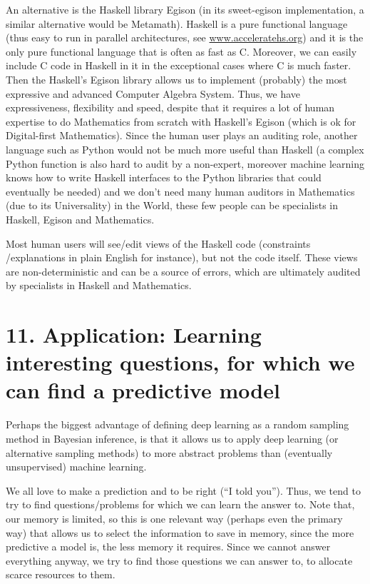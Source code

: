 \documentclass[11pt]{book}
\begin{document}
An alternative is the Haskell library Egison (in its sweet-egison
implementation\cite{egi_functional_2020}, a similar alternative would be
Metamath\cite{polu_generative_2020}). Haskell is a pure functional language (thus easy to run in
parallel architectures, see \url{www.acceleratehs.org}) and it is the
only pure functional language that is often as fast as C. Moreover, we
can easily include C code in Haskell in it in the exceptional cases
where C is much faster. Then the Haskell's Egison library allows us to
implement (probably) the most expressive and advanced Computer Algebra
System. Thus, we have expressiveness, flexibility and speed, despite
that it requires a lot of human expertise to do Mathematics from scratch
with Haskell's Egison (which is ok for Digital-first Mathematics). Since
the human user plays an auditing role, another language such as Python
would not be much more useful than Haskell (a complex Python function is
also hard to audit by a non-expert, moreover machine learning knows how
to write Haskell interfaces to the Python libraries that could
eventually be needed) and we don't need many human auditors in
Mathematics (due to its Universality) in the World, these few people can
be specialists in Haskell, Egison and Mathematics.

Most human users will see/edit views of the Haskell code (constraints
/explanations in plain English for instance), but not the code itself.
These views are non-deterministic and can be a source of errors, which
are ultimately audited by specialists in Haskell and Mathematics.

\hypertarget{application-learning-interesting-questions-for-which-we-can-find-a-predictive-model}{%
\section{11. Application: Learning interesting questions, for which we
can find a predictive
model}\label{application-learning-interesting-questions-for-which-we-can-find-a-predictive-model}}

Perhaps the biggest advantage of defining deep learning as a random
sampling method in Bayesian inference, is that it allows us to apply
deep learning (or alternative sampling methods) to more abstract
problems than (eventually unsupervised) machine learning.

We all love to make a prediction and to be right (``I told you''). Thus,
we tend to try to find questions/problems for which we can learn the
answer to. Note that, our memory is limited, so this is one relevant way
(perhaps even the primary way) that allows us to select the information
to save in memory, since the more predictive a model is, the less memory
it requires\cite{deletang_language_2023}. Since we cannot answer everything anyway, we try to find
those questions we can answer to, to allocate scarce resources to them.
\end{document}
